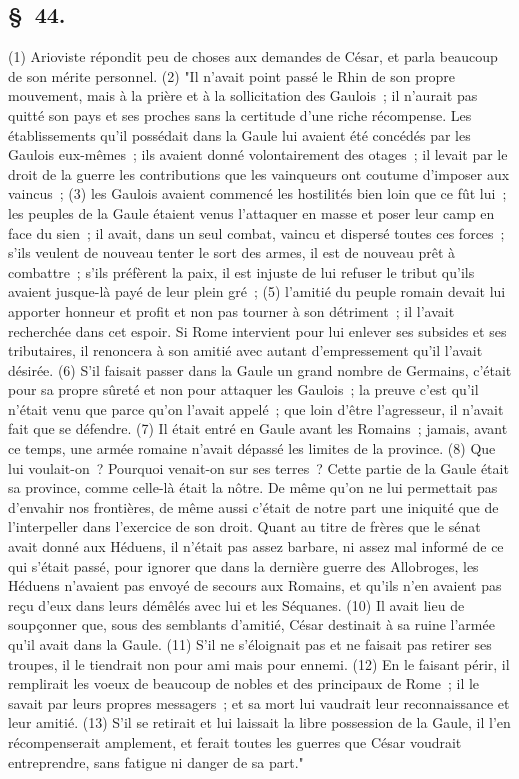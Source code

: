 \documentclass[french,twoside]{book} %
\begin{document}
\subsection[{§ 44.}]{ \textsc{§ 44.} }
\noindent (1) Arioviste répondit peu de choses aux demandes de César, et parla beaucoup de son mérite personnel. (2) "Il n’avait point passé le Rhin de son propre mouvement, mais à la prière et à la sollicitation des Gaulois ; il n’aurait pas quitté son pays et ses proches sans la certitude d’une riche récompense. Les établissements qu’il possédait dans la Gaule lui avaient été concédés par les Gaulois eux-mêmes ; ils avaient donné volontairement des otages ; il levait par le droit de la guerre les contributions que les vainqueurs ont coutume d’imposer aux vaincus ; (3) les Gaulois avaient commencé les hostilités bien loin que ce fût lui ; les peuples de la Gaule étaient venus l’attaquer en masse et poser leur camp en face du sien ; il avait, dans un seul combat, vaincu et dispersé toutes ces forces ; s’ils veulent de nouveau tenter le sort des armes, il est de nouveau prêt à combattre ; s’ils préfèrent la paix, il est injuste de lui refuser le tribut qu’ils avaient jusque-là payé de leur plein gré ; (5) l’amitié du peuple romain devait lui apporter honneur et profit et non pas tourner à son détriment ; il l’avait recherchée dans cet espoir. Si Rome intervient pour lui enlever ses subsides et ses tributaires, il renoncera à son amitié avec autant d’empressement qu’il l’avait désirée. (6) S'il faisait passer dans la Gaule un grand nombre de Germains, c’était pour sa propre sûreté et non pour attaquer les Gaulois ; la preuve c’est qu’il n’était venu que parce qu’on l’avait appelé ; que loin d’être l’agresseur, il n’avait fait que se défendre. (7) Il était entré en Gaule avant les Romains ; jamais, avant ce temps, une armée romaine n’avait dépassé les limites de la province. (8) Que lui voulait-on ? Pourquoi venait-on sur ses terres ? Cette partie de la Gaule était sa province, comme celle-là était la nôtre. De même qu’on ne lui permettait pas d’envahir nos frontières, de même aussi c’était de notre part une iniquité que de l’interpeller dans l’exercice de son droit. Quant au titre de frères que le sénat avait donné aux Héduens, il n’était pas assez barbare, ni assez mal informé de ce qui s’était passé, pour ignorer que dans la dernière guerre des Allobroges, les Héduens n’avaient pas envoyé de secours aux Romains, et qu’ils n’en avaient pas reçu d’eux dans leurs démêlés avec lui et les Séquanes. (10) Il avait lieu de soupçonner que, sous des semblants d’amitié, César destinait à sa ruine l’armée qu’il avait dans la Gaule. (11) S'il ne s’éloignait pas et ne faisait pas retirer ses troupes, il le tiendrait non pour ami mais pour ennemi. (12) En le faisant périr, il remplirait les voeux de beaucoup de nobles et des principaux de Rome ; il le savait par leurs propres messagers ; et sa mort lui vaudrait leur reconnaissance et leur amitié. (13) S'il se retirait et lui laissait la libre possession de la Gaule, il l’en récompenserait amplement, et ferait toutes les guerres que César voudrait entreprendre, sans fatigue ni danger de sa part."
\end{document}
